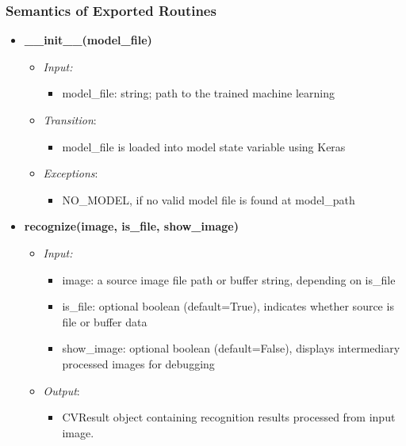 \documentclass[11pt]{article}
\begin{document}
		\subsubsection{Semantics of Exported Routines}
		\begin{itemize}
		    \item \textbf{\_\_init\_\_(model\_file)}
		\begin{itemize}
		    \item[] \textit{Input: }
			\begin{itemize}
		        \item model\_file: string; path to the trained machine learning
		    \end{itemize}	    
		    
		    \item[] \textit{Transition}: 
		    \begin{itemize}
		        \item model\_file is loaded into model state variable using Keras
		    \end{itemize}
		    
		    \item[] \textit{Exceptions}:
		    \begin{itemize}
		        \item NO\_MODEL, if no valid model file is found at model\_path
		    \end{itemize}
		\end{itemize}
		
		
		\item \textbf{recognize(image, is\_file, show\_image)}
		\begin{itemize}
		    \item[] \textit{Input: }
			\begin{itemize}
		        \item image: a source image file path or buffer string, depending on is\_file
		        \item is\_file: optional boolean (default=True), indicates whether source is file or buffer data
		        \item show\_image: optional boolean (default=False), displays intermediary processed images for debugging
		    \end{itemize}	    
		    
		    \item[] \textit{Output}: 
		    \begin{itemize}
		        \item CVResult object containing recognition results processed from input image.
		    \end{itemize}
		    

\end{itemize}
\end{itemize}
\end{document}

